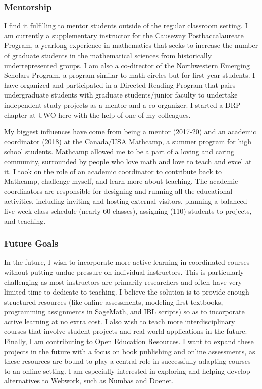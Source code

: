 \documentclass[
]{report}
\begin{document}
\hypertarget{mentorship}{%
\subsubsection*{Mentorship}\label{mentorship}}


I find it fulfilling to mentor students outside of the regular classroom setting.
I am currently a supplementary instructor for the Causeway Postbaccalaureate Program, a yearlong experience in mathematics that seeks to increase the number of graduate students in the mathematical sciences from historically underrepresented groups.
I am also a co-director of the Northwestern Emerging Scholars Program, a program similar to math circles but for first-year students.
I have organized and participated in a Directed Reading Program that pairs undergraduate students with graduate students/junior faculty to undertake independent study projects as a mentor and a co-organizer.
I started a DRP chapter at UWO here with the help of one of my colleagues.

My biggest influences have come from being a mentor (2017-20) and an academic coordinator (2018) at the Canada/USA Mathcamp, a summer program for high school students. Mathcamp allowed me to be a part of a loving and caring community, surrounded by people who love math and love to teach and excel at it. I took on the role of an academic coordinator to contribute back to Mathcamp, challenge myself, and learn more about teaching. The academic coordinators are responsible for designing and running all the educational activities, including inviting and hosting external visitors, planning a balanced five-week class schedule (nearly 60 classes), assigning (110) students to projects, and teaching.

\hypertarget{future-goals}{%
\subsubsection*{Future Goals}\label{future-goals}}


In the future, I wish to incorporate more active learning in coordinated courses without putting undue pressure on individual instructors. This is particularly challenging as most instructors are primarily researchers and often have very limited time to dedicate to teaching. I believe the solution is to provide enough structured resources (like online assessments, modeling first textbooks, programming assignments in SageMath, and IBL scripts) so as to incorporate active learning at no extra cost. I also wish to teach more interdisciplinary courses that involve student projects and real-world applications in the future. Finally, I am contributing to Open Education Resources. I want to expand these projects in the future with a focus on book publishing and online assessments, as these resources are bound to play a central role in successfully adapting courses to an online setting. I am especially interested in exploring and helping develop alternatives to Webwork, such as \href{https://numbas.mathcentre.ac.uk/}{Numbas} and \href{https://www.doenet.org/}{Doenet}.
\end{document}
